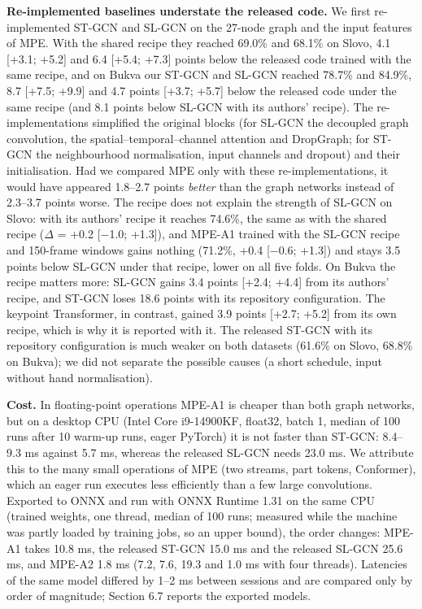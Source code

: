 \documentclass[a4paper,fleqn]{cas-dc}
\begin{document}
\textbf{Re-implemented baselines understate the released code.} We first re-implemented ST-GCN and SL-GCN on the 27-node graph and the input features of MPE. With the shared recipe they reached 69.0\% and 68.1\% on Slovo, 4.1 {[}+3.1; +5.2{]} and 6.4 {[}+5.4; +7.3{]} points below the released code trained with the same recipe, and on Bukva our ST-GCN and SL-GCN reached 78.7\% and 84.9\%, 8.7 {[}+7.5; +9.9{]} and 4.7 points {[}+3.7; +5.7{]} below the released code under the same recipe (and 8.1 points below SL-GCN with its authors' recipe). The re-implementations simplified the original blocks (for SL-GCN the decoupled graph convolution, the spatial--temporal--channel attention and DropGraph; for ST-GCN the neighbourhood normalisation, input channels and dropout) and their initialisation. Had we compared MPE only with these re-implementations, it would have appeared 1.8--2.7 points \emph{better} than the graph networks instead of 2.3--3.7 points worse. The recipe does not explain the strength of SL-GCN on Slovo: with its authors' recipe it reaches 74.6\%, the same as with the shared recipe (\(\Delta\) = +0.2 {[}$-$1.0; +1.3{]}), and MPE-A1 trained with the SL-GCN recipe and 150-frame windows gains nothing (71.2\%, +0.4 {[}$-$0.6; +1.3{]}) and stays 3.5 points below SL-GCN under that recipe, lower on all five folds. On Bukva the recipe matters more: SL-GCN gains 3.4 points {[}+2.4; +4.4{]} from its authors' recipe, and ST-GCN loses 18.6 points with its repository configuration. The keypoint Transformer, in contrast, gained 3.9 points {[}+2.7; +5.2{]} from its own recipe, which is why it is reported with it. The released ST-GCN with its repository configuration is much weaker on both datasets (61.6\% on Slovo, 68.8\% on Bukva); we did not separate the possible causes (a short schedule, input without hand normalisation).

\textbf{Cost.} In floating-point operations MPE-A1 is cheaper than both graph networks, but on a desktop CPU (Intel Core i9-14900KF, float32, batch 1, median of 100 runs after 10 warm-up runs, eager PyTorch) it is not faster than ST-GCN: 8.4--9.3 ms against 5.7 ms, whereas the released SL-GCN needs 23.0 ms. We attribute this to the many small operations of MPE (two streams, part tokens, Conformer), which an eager run executes less efficiently than a few large convolutions. Exported to ONNX and run with ONNX Runtime 1.31 on the same CPU (trained weights, one thread, median of 100 runs; measured while the machine was partly loaded by training jobs, so an upper bound), the order changes: MPE-A1 takes 10.8 ms, the released ST-GCN 15.0 ms and the released SL-GCN 25.6 ms, and MPE-A2 1.8 ms (7.2, 7.6, 19.3 and 1.0 ms with four threads). Latencies of the same model differed by 1--2 ms between sessions and are compared only by order of magnitude; Section 6.7 reports the exported models.
\end{document}
